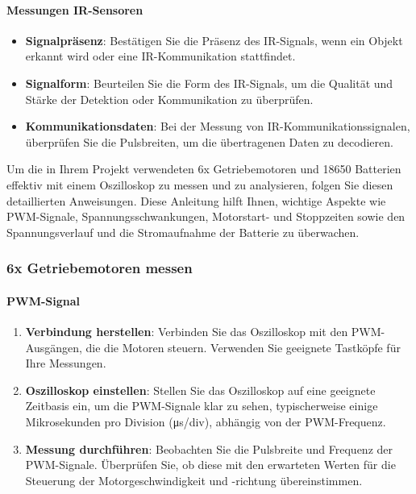 \documentclass{vorlage-design-main}
\begin{document}
\hypertarget{messungen-ir-sensoren}{%
\paragraph{Messungen IR-Sensoren}\label{messungen-ir-sensoren}}

\begin{itemize}

\item
  \textbf{Signalpräsenz}: Bestätigen Sie die Präsenz des IR-Signals,
  wenn ein Objekt erkannt wird oder eine IR-Kommunikation stattfindet.
\item
  \textbf{Signalform}: Beurteilen Sie die Form des IR-Signals, um die
  Qualität und Stärke der Detektion oder Kommunikation zu überprüfen.
\item
  \textbf{Kommunikationsdaten}: Bei der Messung von
  IR-Kommunikationssignalen, überprüfen Sie die Pulsbreiten, um die
  übertragenen Daten zu decodieren.
\end{itemize}

Um die in Ihrem Projekt verwendeten 6x Getriebemotoren und 18650
Batterien effektiv mit einem Oszilloskop zu messen und zu analysieren,
folgen Sie diesen detaillierten Anweisungen. Diese Anleitung hilft
Ihnen, wichtige Aspekte wie PWM-Signale, Spannungsschwankungen,
Motorstart- und Stoppzeiten sowie den Spannungsverlauf und die
Stromaufnahme der Batterie zu überwachen.

\hypertarget{x-getriebemotoren-messen}{%
\subsubsection{6x Getriebemotoren
messen}\label{x-getriebemotoren-messen}}

\hypertarget{pwm-signal}{%
\paragraph{PWM-Signal}\label{pwm-signal}}

\begin{enumerate}
\def\labelenumi{\arabic{enumi}.}

\item
  \textbf{Verbindung herstellen}: Verbinden Sie das Oszilloskop mit den
  PWM-Ausgängen, die die Motoren steuern. Verwenden Sie geeignete
  Tastköpfe für Ihre Messungen.
\item
  \textbf{Oszilloskop einstellen}: Stellen Sie das Oszilloskop auf eine
  geeignete Zeitbasis ein, um die PWM-Signale klar zu sehen,
  typischerweise einige Mikrosekunden pro Division (μs/div), abhängig
  von der PWM-Frequenz.
\item
  \textbf{Messung durchführen}: Beobachten Sie die Pulsbreite und
  Frequenz der PWM-Signale. Überprüfen Sie, ob diese mit den erwarteten
  Werten für die Steuerung der Motorgeschwindigkeit und -richtung
  übereinstimmen.
\end{enumerate}
\end{document}

